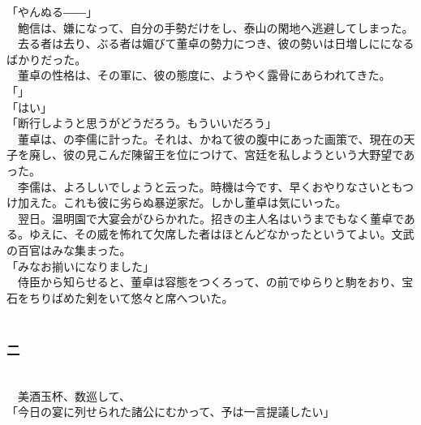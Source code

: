 \documentclass[
  paper=a5,
  fontsize=10pt,
  jafontsize=9.5pt,
  tate,                  %
  open_bracket_pos=nibu, %
]{jlreq}
\begin{document}
「やんぬる――」\\


　鮑信は、嫌になって、自分の手勢だけをし、泰山の閑地へ逃避してしまった。\\


　去る者は去り、ぶる者は媚びて董卓の勢力につき、彼の勢いは日増しにになるばかりだった。\\


　董卓の性格は、その軍に、彼の態度に、ようやく露骨にあらわれてきた。\\


「」\\


「はい」\\


「断行しようと思うがどうだろう。もういいだろう」\\


　董卓は、の李儒に計った。それは、かねて彼の腹中にあった画策で、現在の天子を廃し、彼の見こんだ陳留王を位につけて、宮廷を私しようという大野望であった。\\


　李儒は、よろしいでしょうと云った。時機は今です、早くおやりなさいともつけ加えた。これも彼に劣らぬ暴逆家だ。しかし董卓は気にいった。\\


　翌日。温明園で大宴会がひらかれた。招きの主人名はいうまでもなく董卓である。ゆえに、その威を怖れて欠席した者はほとんどなかったというてよい。文武の百官はみな集まった。\\


「みなお揃いになりました」\\


　侍臣から知らせると、董卓は容態をつくろって、の前でゆらりと駒をおり、宝石をちりばめた剣をいて悠々と席へついた。\\

\\

\subsubsection{二}

\\


　美酒玉杯、数巡して、\\


「今日の宴に列せられた諸公にむかって、予は一言提議したい」\\
\end{document}
